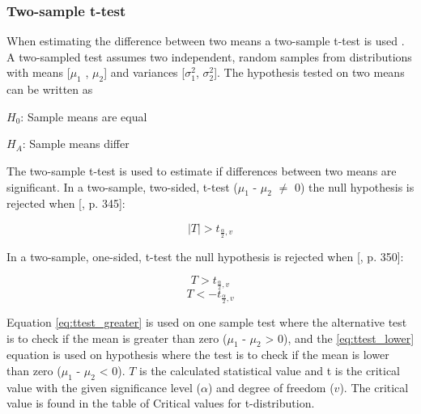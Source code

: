 
\subsubsection{Two-sample t-test}\label{sec:t-test}
When estimating the difference between two means a two-sample t-test is used \citep{Walpole2012}. A two-sampled test assumes two independent, random samples from distributions with means [$\mu_{1}$ , $\mu_{2}$] and variances [$\sigma_{1}^{2}$, $\sigma_{2}^{2}$]. %
The hypothesis tested on two means can be written as\newline

\centerline{$H_{0}$: Sample means are equal} 
\centerline{$H_{A}$: Sample means differ}

The two-sample t-test is used to estimate if differences between two means are significant. In a two-sample, two-sided, t-test ($\mu_{1}$ - $\mu_{2}$ $\neq$ 0) the null hypothesis is rejected when [\citep{Walpole2012}, p. 345]:

\begin{equation}
\label{eq:ttest_twoway}
|T| > t_{\frac{\alpha}{2}, v} 
\end{equation}

In a two-sample, one-sided, t-test the null hypothesis is rejected when [\citep{Walpole2012}, p. 350]:

\begin{equation}
\label{eq:ttest_greater}
T > t_{\frac{\alpha}{2}, v}
\end{equation}
\begin{equation}
\label{eq:ttest_lower}
T < - t_{\frac{\alpha}{2}, v}
\end{equation}

Equation \ref{eq:ttest_greater} is used on one sample test where the alternative test is to check if the mean is greater than zero ($\mu_{1}$ - $\mu_{2}$ > 0), and the \ref{eq:ttest_lower} equation is used on hypothesis where the test is to check if the mean is lower than zero ($\mu_{1}$ - $\mu_{2}$ < 0). $T$ is the calculated statistical value and t is the critical value with the given significance level ($\alpha$) and degree of freedom ($v$). The critical value is found in the table of Critical values for t-distribution. \newline 
 
